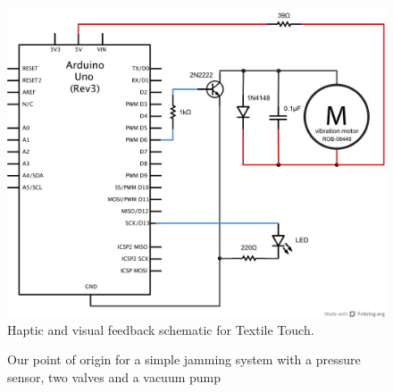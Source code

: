 \begin{figure}[h]
	\centering
  		\includegraphics[width=\textwidth]{figures/schematics/textile-touch-feedback.pdf}
	\caption{Haptic and visual feedback schematic for Textile Touch.}
\end{figure}

\begin{landscape}
	\thispagestyle{empty}
	\centering
	\begin{figure}[p]
	    \caption{Our point of origin for a simple jamming system with a pressure sensor, two valves and a vacuum pump}
	\end{figure}
\end{landscape}
